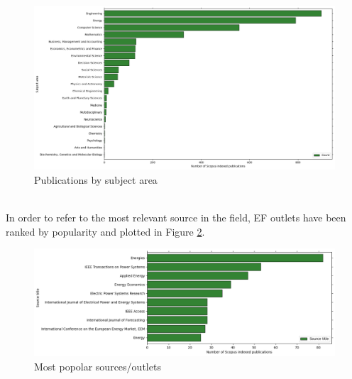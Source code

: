 \begin{figure}
  \includegraphics[width=\textwidth]{images/subject_area.png}
  \caption{Publications by subject area}
  \label{fig:subject_area}
\end{figure}
\\
In order to refer to the most relevant source in the field, EF outlets have been ranked by popularity and plotted in Figure \ref{fig:src_title}.
\begin{figure}
  \includegraphics[width=\textwidth]{images/src_title.png}
  \caption{Most popolar sources/outlets}
  \label{fig:src_title}
\end{figure}
\\
